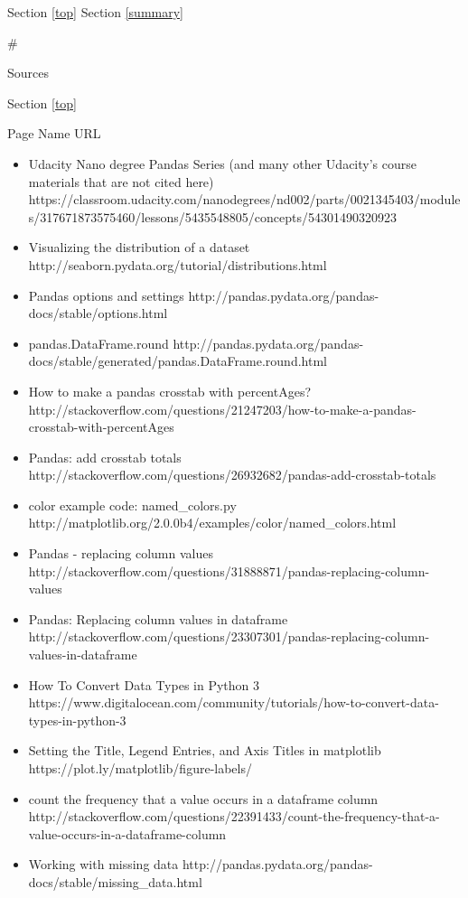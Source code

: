 \documentclass[11pt]{article}
\begin{document}
Section \ref{top} Section \ref{summary}

     \#

Sources

Section \ref{top}

    Page Name \textbar{} URL

\begin{itemize}
\item
  Udacity Nano degree Pandas Series (and many other Udacity's course
  materials that are not cited here)
  https://classroom.udacity.com/nanodegrees/nd002/parts/0021345403/modules/317671873575460/lessons/5435548805/concepts/54301490320923
\item
  Visualizing the distribution of a dataset
  http://seaborn.pydata.org/tutorial/distributions.html
\item
  Pandas options and settings
  http://pandas.pydata.org/pandas-docs/stable/options.html
\item
  pandas.DataFrame.round
  http://pandas.pydata.org/pandas-docs/stable/generated/pandas.DataFrame.round.html
\item
  How to make a pandas crosstab with percentAges?
  http://stackoverflow.com/questions/21247203/how-to-make-a-pandas-crosstab-with-percentAges
\item
  Pandas: add crosstab totals
  http://stackoverflow.com/questions/26932682/pandas-add-crosstab-totals
\item
  color example code: named\_colors.py
  http://matplotlib.org/2.0.0b4/examples/color/named\_colors.html
\item
  Pandas - replacing column values
  http://stackoverflow.com/questions/31888871/pandas-replacing-column-values
\item
  Pandas: Replacing column values in dataframe
  http://stackoverflow.com/questions/23307301/pandas-replacing-column-values-in-dataframe
\item
  How To Convert Data Types in Python 3
  https://www.digitalocean.com/community/tutorials/how-to-convert-data-types-in-python-3
\item
  Setting the Title, Legend Entries, and Axis Titles in matplotlib
  https://plot.ly/matplotlib/figure-labels/
\item
  count the frequency that a value occurs in a dataframe column
  http://stackoverflow.com/questions/22391433/count-the-frequency-that-a-value-occurs-in-a-dataframe-column
\item
  Working with missing data
  http://pandas.pydata.org/pandas-docs/stable/missing\_data.html

\end{itemize}
\end{document}
